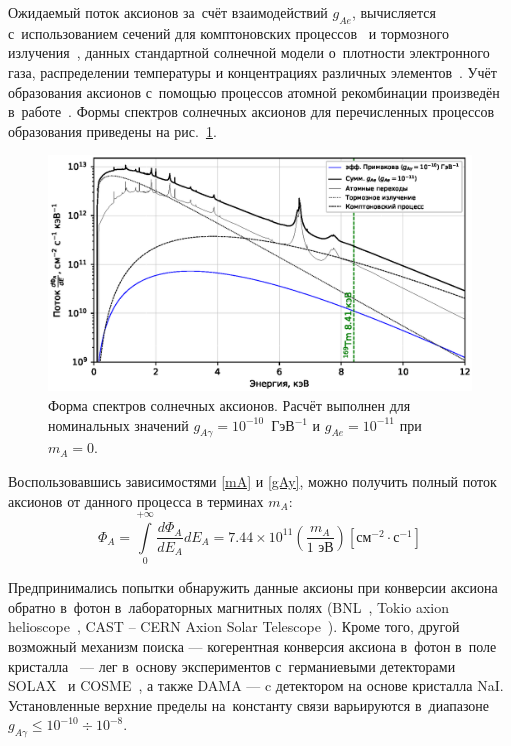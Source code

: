 \documentclass[a4paper,article,14pt]{extarticle}
\begin{document}
Ожидаемый поток аксионов за~счёт взаимодействий $g_{Ae}$, вычисляется с~использованием сечений для комптоновских процессов~\cite{pospelov2008bosonic,gondolo2009solar} и тормозного излучения~\cite{brem}, данных стандартной солнечной модели о~плотности электронного газа, распределении температуры и концентрациях различных элементов~\cite{kekez2009search,derbin2011constraints}. Учёт образования аксионов с~помощью процессов атомной рекомбинации произведён в~работе~\cite{redondo2013solar}.
Формы спектров солнечных аксионов для перечисленных процессов образования приведены на рис.~\ref{fig:flux}.
\begin{figure}[t]
    \centering
    \includegraphics[width = .9\textwidth]{images/flux_solar_ru.eps}
    \caption{Форма спектров солнечных аксионов. Расчёт выполнен для номинальных значений $g_{A\gamma} = 10^{-10}$~ГэВ$^{-1}$ и $g_{Ae} = 10^{-11}$ при $m_A = 0$.}\label{fig:flux}
\end{figure}
Воспользовавшись зависимостями \eqref{mA} и \eqref{gAy}, можно получить полный поток аксионов от данного процесса в терминах $m_A$:
\begin{equation}
    \Phi_A =
    \int\limits_0^{+\infty} \frac{d\Phi_A}{dE_A} d{E_A} =
    7.44 \times 10^{11}
    \left(
    \frac{m_A}{1 \text{\ эВ}}
    \right)
    \left[
        \text{см}^{-2} \cdot \text{с}^{-1}
        \right]
\end{equation}

Предпринимались попытки обнаружить данные аксионы при конверсии аксиона обратно в~фотон в~лабораторных магнитных полях (BNL~\cite{lazarus1992search}, Tokio axion helioscope~\cite{moriyama1998direct,inoue2002search}, CAST -- CERN Axion Solar Telescope~\cite{beltran2005search}).
Кроме того, другой возможный механизм поиска --- когерентная конверсия аксиона в~фотон в~поле кристалла~\cite{paschos1994proposal} --- лег в~основу экспериментов с~германиевыми детекторами SOLAX~\cite{avignone1998first, avignone1999solar} и COSME~\cite{scopel1998theoretical,morales2002particle}, а также DAMA \cite{bernabei2001search} --- c детектором на основе кристалла NaI.
Установленные верхние пределы на~константу связи варьируются в~диапазоне $g_{A \gamma} \leqslant 10^{-10} \div 10^{-8}$.
\end{document}
